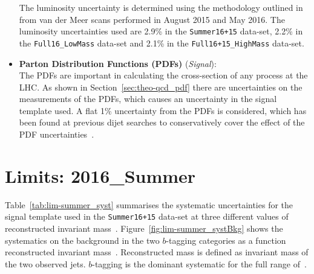 \begin{itemize}[leftmargin=*]
  The luminosity uncertainty is determined using the methodology outlined in~\cite{lim-syst_lumi}
  from van der Meer scans performed in August 2015 and May 2016.
  The luminosity uncertainties used are 2.9\% in the \verb|Summer16+15| data-set,
  2.2\% in the \verb|Full16_LowMass| data-set
  and 2.1\% in the \verb|Full16+15_HighMass| data-set.
  \vspace{0.5em}
\item\textbf{Parton Distribution Functions (PDFs) } \hspace{1mm}  (\textit{Signal}):\\
  The PDFs are important in calculating the cross-section of any process at the LHC.
  As shown in Section~\ref{sec:theo-qcd_pdf} there are uncertainties on the measurements of the PDFs,
  which causes an uncertainty in the signal template used.
  A flat 1\% uncertainty from the PDFs is considered,
  which has been found at previous dijet searches to conservatively cover
  the effect of the PDF uncertainties~\cite{dijet-mori16_paper}.
  \vspace{0.5em}
\end{itemize}

\section{Limits: 2016\_Summer}
\label{sec:lim-summer}

Table~\ref{tab:lim-summer_syst} summarises the systematic uncertainties
for the signal template used in the \verb|Summer16+15| data-set at
three different values of reconstructed invariant mass~\mjj.
Figure~\ref{fig:lim-summer_systBkg} shows the systematics on the background
in the two $b$-tagging categories as a function reconstructed invariant mass~\mjj.
Reconstructed mass is defined as invariant mass of the two observed jets.
$b$-tagging is the dominant systematic for the full range of~\mjj.

